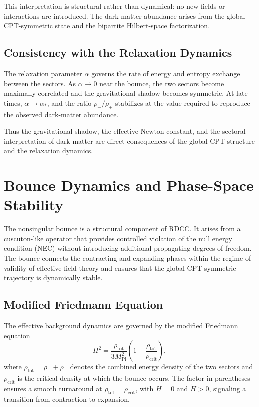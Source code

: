 \documentclass[11pt,a4paper]{article}
\begin{document}
This interpretation is structural rather than dynamical: no new fields or
interactions are introduced. The dark-matter abundance arises from the global
CPT-symmetric state and the bipartite Hilbert-space factorization.

\subsection{Consistency with the Relaxation Dynamics}

The relaxation parameter \(\alpha\) governs the rate of energy and entropy
exchange between the sectors. As \(\alpha \to 0\) near the bounce, the two sectors
become maximally correlated and the gravitational shadow becomes symmetric.
At late times, \(\alpha \to \alpha_{*}\), and the ratio \(\rho_{-}/\rho_{+}\) stabilizes
at the value required to reproduce the observed dark-matter abundance.

Thus the gravitational shadow, the effective Newton constant, and the
sectoral interpretation of dark matter are direct consequences of the global
CPT structure and the relaxation dynamics.

\section{Bounce Dynamics and Phase-Space Stability}

The nonsingular bounce is a structural component of RDCC. It arises from a
cuscuton-like operator that provides controlled violation of the null energy
condition (NEC) without introducing additional propagating degrees of freedom.
The bounce connects the contracting and expanding phases within the regime of
validity of effective field theory and ensures that the global CPT-symmetric
trajectory is dynamically stable.

\subsection{Modified Friedmann Equation}

The effective background dynamics are governed by the modified Friedmann
equation
\begin{equation}
    H^{2}
        = \frac{\rho_{\mathrm{tot}}}{3M_{\mathrm{Pl}}^{2}}
          \left(1 - \frac{\rho_{\mathrm{tot}}}{\rho_{\mathrm{crit}}}\right),
\end{equation}
where \(\rho_{\mathrm{tot}} = \rho_{+} + \rho_{-}\) denotes the combined energy
density of the two sectors and \(\rho_{\mathrm{crit}}\) is the critical density at
which the bounce occurs. The factor in parentheses ensures a smooth turnaround
at \(\rho_{\mathrm{tot}} = \rho_{\mathrm{crit}}\), with \(H = 0\) and
\(\dot{H} > 0\), signaling a transition from contraction to expansion.
\end{document}
